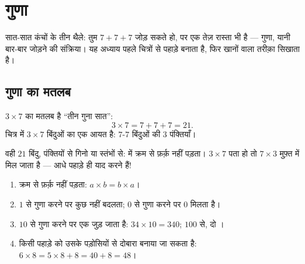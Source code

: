 \chapter{गुणा}\label{ch:g3:mult}

सात-सात कंचों के तीन थैले: तुम $7 + 7 + 7$ जोड़ सकते हो, पर एक
तेज़ रास्ता भी है --- गुणा, यानी बार-बार जोड़ने की संक्रिया।
यह अध्याय पहले चित्रों से पहाड़े बनाता है, फिर खानों वाला
तरीक़ा सिखाता है।

\section{गुणा का मतलब}

\begin{definition}[गुणा]\label{def:g3:mult:def}
 $3 \times 7$ का मतलब है ``तीन गुना सात'':
\[
3 \times 7 = 7 + 7 + 7 = 21 .
\]
चित्र में $3 \times 7$ बिंदुओं का एक आयत है: $7$-$7$ बिंदुओं
की $3$ पंक्तियाँ।
\end{definition}

\begin{omfigure}

{\small वही $21$ बिंदु, पंक्तियों से गिनो या स्तंभों से:
 में क्रम से फ़र्क़ नहीं पड़ता। $3 \times 7$ पता हो तो
$7 \times 3$ मुफ़्त में मिल जाता है --- आधे पहाड़े ही याद करने हैं!}
\end{omfigure}

\begin{proposition}[काम आने वाले नियम]\label{prop:g3:mult:rules}
\begin{enumerate}
  \item क्रम से फ़र्क़ नहीं पड़ता: $a \times b = b \times a$।
  \item $1$ से गुणा करने पर कुछ नहीं बदलता; $0$ से गुणा करने पर
        $0$ मिलता है।
  \item $10$ से गुणा करने पर एक  जुड़ जाता है:
        $34 \times 10 = 340$; $100$ से, दो ।
  \item किसी पहाड़े को उसके पड़ोसियों से दोबारा बनाया जा सकता है:
        $6 \times 8 = 5 \times 8 + 8 = 40 + 8 = 48$।
\end{enumerate}
\end{proposition}
\admitted

